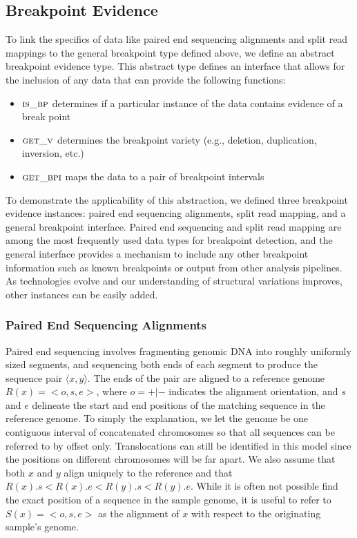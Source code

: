 \documentclass[11pt]{article}
\begin{document}
\subsection{Breakpoint Evidence}

To link the specifics of data like paired end sequencing alignments and split
read mappings to the general breakpoint type defined above, we define an
abstract breakpoint evidence type.  This abstract type defines an interface that
allows for the inclusion of any data that can provide the following functions:

\begin{itemize}
	\item $\textsc{is\_bp}$ determines if a particular
	instance of the data contains evidence of a break point
	\item $\textsc{get\_v}$ determines the breakpoint 
	variety (e.g., deletion, duplication, inversion, etc.)
	\item $\textsc{get\_bpi}$ maps the data to a pair of
	breakpoint intervals
\end{itemize}

To demonstrate the applicability of this abstraction, we defined three
breakpoint evidence instances: paired end sequencing alignments, split read
mapping, and a general breakpoint interface.  Paired end sequencing and split
read mapping are among the most frequently used data types for breakpoint
detection, and the general interface provides a mechanism to include any other
breakpoint information such as known breakpoints or output from other analysis
pipelines.  As technologies evolve and our understanding of structural
variations improves, other instances can be easily added.

\subsubsection{Paired End Sequencing Alignments}

Paired end sequencing involves fragmenting genomic DNA into roughly uniformly
sized segments, and sequencing both ends of each segment to produce the sequence
pair $\langle x,y \rangle$.  The ends of the pair are
aligned to a reference genome $R(x)=<o,s,e>$, where $o=+|-$ indicates the
alignment orientation, and $s$ and $e$ delineate the start and end positions of
the matching sequence in the reference genome.  To simply the explanation, we
let the genome be one contiguous interval of concatenated chromosomes so that
all sequences can be referred to by offset only.  Translocations can still be
identified in this model since the positions on different chromosomes will be
far apart.  We also assume that both $x$ and $y$ align uniquely to the
reference and that $R(x).s<R(x).e<R(y).s<R(y).e$.  While it is often not
possible find the exact position of a sequence in the sample genome, it is
useful to refer to $S(x)=<o,s,e>$ as the alignment of $x$ with respect to the
originating sample's genome.  
\end{document}

